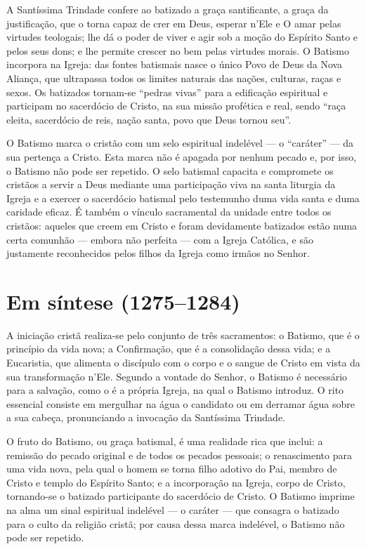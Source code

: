 A Santíssima Trindade confere ao batizado a graça santificante, a graça da justificação, que o torna capaz de crer em Deus, esperar n'Ele e O amar pelas virtudes teologais; lhe dá o poder de viver e agir sob a moção do Espírito Santo e pelos seus dons; e lhe permite crescer no bem pelas virtudes morais. O Batismo incorpora na Igreja: das fontes batismais nasce o único Povo de Deus da Nova Aliança, que ultrapassa todos os limites naturais das nações, culturas, raças e sexos. Os batizados tornam-se ``pedras vivas'' para a edificação espiritual e participam no sacerdócio de Cristo, na sua missão profética e real, sendo ``raça eleita, sacerdócio de reis, nação santa, povo que Deus tornou seu''.

O Batismo marca o cristão com um selo espiritual indelével --- o ``caráter'' --- da sua pertença a Cristo. Esta marca não é apagada por nenhum pecado e, por isso, o Batismo não pode ser repetido. O selo batismal capacita e compromete os cristãos a servir a Deus mediante uma participação viva na santa liturgia da Igreja e a exercer o sacerdócio batismal pelo testemunho duma vida santa e duma caridade eficaz. É também o vínculo sacramental da unidade entre todos os cristãos: aqueles que creem em Cristo e foram devidamente batizados estão numa certa comunhão --- embora não perfeita --- com a Igreja Católica, e são justamente reconhecidos pelos filhos da Igreja como irmãos no Senhor.

\section{Em síntese (1275--1284)}

A iniciação cristã realiza-se pelo conjunto de três sacramentos: o Batismo, que é o princípio da vida nova; a Confirmação, que é a consolidação dessa vida; e a Eucaristia, que alimenta o discípulo com o corpo e o sangue de Cristo em vista da sua transformação n'Ele. Segundo a vontade do Senhor, o Batismo é necessário para a salvação, como o é a própria Igreja, na qual o Batismo introduz. O rito essencial consiste em mergulhar na água o candidato ou em derramar água sobre a sua cabeça, pronunciando a invocação da Santíssima Trindade.

O fruto do Batismo, ou graça batismal, é uma realidade rica que inclui: a remissão do pecado original e de todos os pecados pessoais; o renascimento para uma vida nova, pela qual o homem se torna filho adotivo do Pai, membro de Cristo e templo do Espírito Santo; e a incorporação na Igreja, corpo de Cristo, tornando-se o batizado participante do sacerdócio de Cristo. O Batismo imprime na alma um sinal espiritual indelével --- o caráter --- que consagra o batizado para o culto da religião cristã; por causa dessa marca indelével, o Batismo não pode ser repetido.

